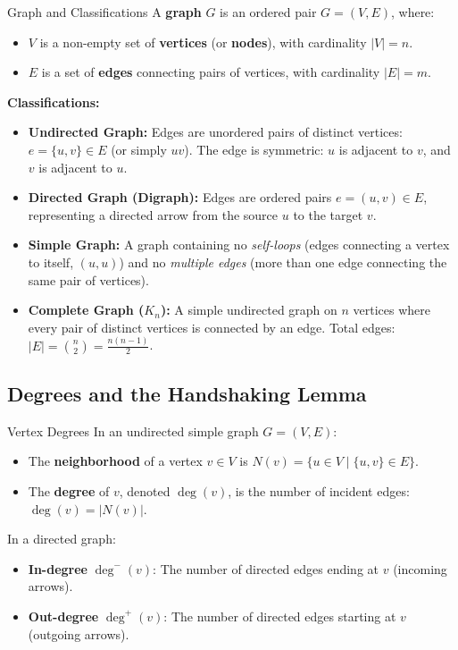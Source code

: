 \begin{definitionbox}{Graph and Classifications}
A \textbf{graph} $G$ is an ordered pair $G = (V, E)$, where:
\begin{itemize}
    \item $V$ is a non-empty set of \textbf{vertices} (or \textbf{nodes}), with cardinality $|V| = n$.
    \item $E$ is a set of \textbf{edges} connecting pairs of vertices, with cardinality $|E| = m$.
\end{itemize}
\textbf{Classifications:}
\begin{itemize}
    \item \textbf{Undirected Graph:} Edges are unordered pairs of distinct vertices: $e = \{u, v\} \in E$ (or simply $uv$). The edge is symmetric: $u$ is adjacent to $v$, and $v$ is adjacent to $u$.
    \item \textbf{Directed Graph (Digraph):} Edges are ordered pairs $e = (u, v) \in E$, representing a directed arrow from the source $u$ to the target $v$.
    \item \textbf{Simple Graph:} A graph containing no \textit{self-loops} (edges connecting a vertex to itself, $(u, u)$) and no \textit{multiple edges} (more than one edge connecting the same pair of vertices).
    \item \textbf{Complete Graph ($K_n$):} A simple undirected graph on $n$ vertices where every pair of distinct vertices is connected by an edge. Total edges: $|E| = \binom{n}{2} = \frac{n(n-1)}{2}$.
\end{itemize}
\end{definitionbox}

\subsection{Degrees and the Handshaking Lemma}

\begin{definitionbox}{Vertex Degrees}
In an undirected simple graph $G = (V, E)$:
\begin{itemize}
    \item The \textbf{neighborhood} of a vertex $v \in V$ is $N(v) = \{u \in V \mid \{u, v\} \in E\}$.
    \item The \textbf{degree} of $v$, denoted $\deg(v)$, is the number of incident edges: $\deg(v) = |N(v)|$.
\end{itemize}
In a directed graph:
\begin{itemize}
    \item \textbf{In-degree} $\deg^-(v)$: The number of directed edges ending at $v$ (incoming arrows).
    \item \textbf{Out-degree} $\deg^+(v)$: The number of directed edges starting at $v$ (outgoing arrows).
\end{itemize}
\end{definitionbox}

